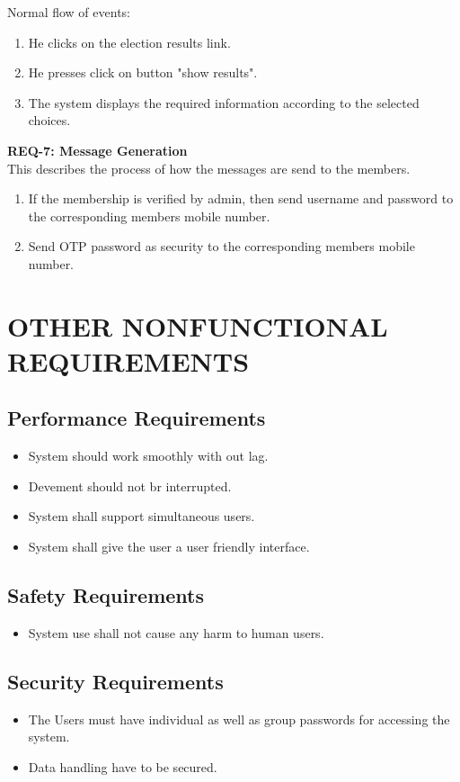 \documentclass[12pt,a4paper,oneside]{report}
\begin{document}
Normal flow of events: 
\begin{enumerate}
\item He clicks on the election results link.
\item He presses click on button "show results".
\item The system displays the required information according to the selected choices. 
\end{enumerate}
\par \textbf{REQ-7: Message Generation }\\
This describes the process of how the messages are send to the members.
\begin{enumerate}
\item If the membership is verified by admin, then send username and password to the corresponding members mobile number.
\item Send OTP password as  security to the corresponding members mobile number.
\end{enumerate} 


\chapter{OTHER NONFUNCTIONAL REQUIREMENTS} 
\section{ Performance Requirements}
\begin{itemize}


\item System should work smoothly with out lag.
\item Devement should not br interrupted. 
\item System shall support simultaneous users.
\item System shall give the user a user friendly interface.
\end{itemize}
\section{ Safety Requirements}
\begin{itemize} 
\item System use shall not cause any harm to human users. 
\end{itemize}   
\section {Security Requirements}
\begin{itemize}
\item	The Users must have individual as well as group passwords for accessing the system.
\item	Data handling have to be secured.
\end{itemize}
\newpage
\end{document}
